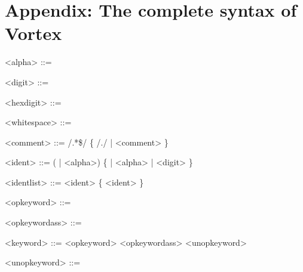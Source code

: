 \documentclass{article}
\newenvironment{bnf}
{
\begin{mdframed}
\begin{grammar}
}
{
\end{grammar}
\end{mdframed}
}
\begin{document}
\section{Appendix: The complete syntax of Vortex}
\begin{bnf}


<alpha> ::= 

<digit> ::= 

<hexdigit> ::= 

<whitespace> ::= \lit{ }
    \alt \lit{\\n}
    \alt \lit{\\r}
    \alt \lit{\\t}
    \alt \lit{\\f}
    \alt \lit{\\v}

<comment> ::= \lit{//} /.*\$/
    \alt \lit{/*} \{ /./ | <comment> \} \lit{*/}

<ident> ::= (\lit{_} | <alpha>) \{ \lit{_} | <alpha> | <digit> \}

<identlist> ::= <ident> \{ \lit{,} <ident> \}

<opkeyword> ::= 
    \alt {}
    \alt {}
    \alt {}
    \alt {}
    \alt {}
    \alt {}
    \alt {}

<opkeywordass> ::= 
    \alt {}
    \alt {}
    \alt {}
    \alt {}
    \alt {}

<keyword> ::= 
    \alt {}
    \alt {}
    \alt {}
    \alt {}
    \alt {}
    \alt {}
    \alt {}
    \alt {}
    \alt {}
    \alt {}
    \alt {}
    \alt {}
    \alt {}
    \alt {}
    \alt {}
    \alt {}
    \alt {}
    \alt {}
    \alt {}
    \alt {}
    \alt {}
    \alt {}
    \alt {}
    \alt {}
    \alt {}
    \alt {}
    \alt {}
    \alt {}
    \alt {}
    \alt {}
    \alt {}
    \alt {}
    \alt {}
    \alt {}
    \alt {}
    \alt {}
    \alt {}
    \alt {}
    \alt {}
    \alt <opkeyword>
    \alt <opkeywordass>
    \alt <unopkeyword>

<unopkeyword> ::= 
    \alt {}


\end{bnf}
\end{document}
